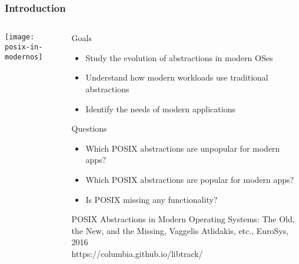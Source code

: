 \begin{frame}[plain]
	\frametitle{Introduction}
	
	
	\begin{columns}
	
	\begin{column}{.4\textwidth}	

			\centering
			\texttt{[image: posix-in-modernos]}


		\end{column}



\begin{column}{.6\textwidth}	
	\large
			Goals
			\begin{itemize}\normalsize
				\item Study the evolution of abstractions in modern OSes
				\item Understand how modern workloads use traditional abstractions
				\item  Identify the needs of modern applications
			\end{itemize}
		
			\large
			Questions
			\begin{itemize}\normalsize
				\item Which POSIX abstractions are unpopular for modern apps?
				\item  Which POSIX abstractions are popular for modern apps?				
				\item  Is POSIX missing any functionality?
				
			\end{itemize}
			
			\tiny POSIX Abstractions in Modern Operating
			Systems: The Old, the New, and the Missing, Vaggelis Atlidakis, etc., EuroSys, 2016
			\\
			https://columbia.github.io/libtrack/
		\end{column}


\end{columns}

	
\end{frame}	


